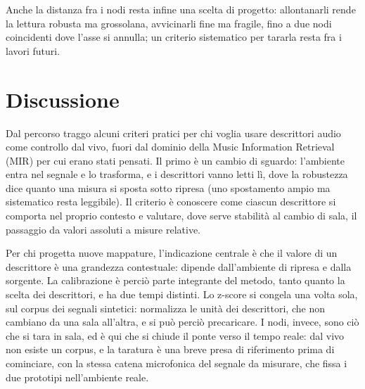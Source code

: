 \documentclass{article}
\begin{document}
Anche la distanza fra i nodi resta infine una scelta di progetto: allontanarli rende la lettura robusta ma grossolana, avvicinarli fine ma fragile, fino a due nodi coincidenti dove l'asse si annulla; un criterio sistematico per tararla resta fra i lavori futuri.

\section{Discussione}\label{sec:discussione}

Dal percorso traggo alcuni criteri pratici per chi voglia usare descrittori audio come controllo dal vivo, fuori dal dominio della Music Information Retrieval (MIR) per cui erano stati pensati. Il primo è un cambio di sguardo: l'ambiente entra nel segnale e lo trasforma, e i descrittori vanno letti lì, dove la robustezza dice quanto una misura si sposta sotto ripresa (uno spostamento ampio ma sistematico resta leggibile). Il criterio è conoscere come ciascun descrittore si comporta nel proprio contesto e valutare, dove serve stabilità al cambio di sala, il passaggio da valori assoluti a misure relative.

Per chi progetta nuove mappature, l'indicazione centrale è che il valore di un descrittore è una grandezza contestuale: dipende dall'ambiente di ripresa e dalla sorgente. La calibrazione è perciò parte integrante del metodo, tanto quanto la scelta dei descrittori, e ha due tempi distinti. Lo z-score si congela una volta sola, sul corpus dei segnali sintetici: normalizza le unità dei descrittori, che non cambiano da una sala all'altra, e si può perciò precaricare. I nodi, invece, sono ciò che si tara in sala, ed è qui che si chiude il ponte verso il tempo reale: dal vivo non esiste un corpus, e la taratura è una breve presa di riferimento prima di cominciare, con la stessa catena microfonica del segnale da misurare, che fissa i due prototipi nell'ambiente reale.
\end{document}
